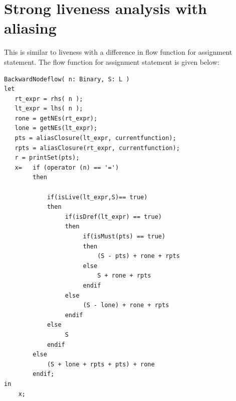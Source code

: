 \documentclass[12pt]{report}
\begin{document}
\section{Strong liveness analysis with aliasing}
This is similar to liveness with a difference in flow function for assignment statement. The flow function for assignment statement is given below:

\begin{verbatim}
BackwardNodeflow( n: Binary, S: L ) 
let
   rt_expr = rhs( n );
   lt_expr = lhs( n );
   rone = getNEs(rt_expr);
   lone = getNEs(lt_expr);
   pts = aliasClosure(lt_expr, currentfunction);
   rpts = aliasClosure(rt_expr, currentfunction);
   r = printSet(pts);
   x=   if (operator (n) == '=')
        then
			
            if(isLive(lt_expr,S)== true)
            then
                 if(isDref(lt_expr) == true)
                 then
                      if(isMust(pts) == true)
                      then				
                          (S - pts) + rone + rpts
                      else
                          S + rone + rpts 	
                      endif		
                 else
                      (S - lone) + rone + rpts
                 endif
            else
                 S
            endif
        else
            (S + lone + rpts + pts) + rone
        endif;
in
	x;
\end{verbatim}

\newpage


\end{document}

